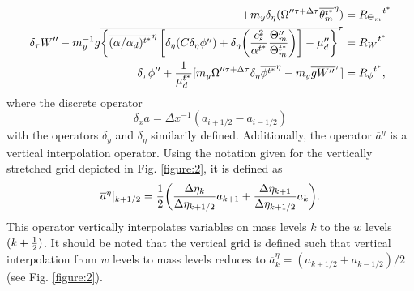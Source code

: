 \begin{align}
+ m_y \delta_\eta (\Omega''^{\tau+\Delta \tau} \overline{\theta_m^{t^*}}^\eta)
                                                &= {R_{\Theta_m}}^{t^*}  
\label{theta-discrete}
\\
 \delta_\tau W'' 
- m_y^{-1} g\overline{\left\{\overline{(\alpha/\alpha_d)^{t^*}}^\eta 
  \left[ \delta_\eta (C \delta_\eta \phi'') 
   +
\delta_\eta\biggl({c_s^2\over\alpha^{t^*}}{\Theta_m''\over\Theta_m^{t^*}}\biggr)
\right]
- \mu_d''\right\}}^\tau
 &= {R_W}^{t^*}  
\label{w-discrete}
\\
 \delta_\tau \phi'' + {1\over\mu_d^{t^*}}
[m_y \Omega''^{\tau+\Delta \tau} \delta_\eta \overline{\phi^{t^*}}^\eta  - m_y\overline{g W''}^\tau ] 
&= {R_\phi}^{t^*},
\label{geo-discrete}
\end{align}
%
\noindent
where the discrete operator 
%
\begin{equation}
\delta_x a = \Delta x^{-1} (a_{i+1/2} -
a_{i-1/2}) 
\end{equation}
%
\noindent
with the operators $\delta_y$ and $\delta_\eta$ similarily defined.
Additionally,
the operator $\overline{a}^\eta$ is a vertical interpolation operator.
Using the notation given for the vertically stretched grid depicted 
in Fig. \ref{figure:2}, it is defined as
%
\begin{equation}
\overline{a}^\eta|_{k+1/2} = {1 \over 2} \biggl(
{\Delta\eta_{k} \over \Delta\eta_{k+1/2}} a_{k+1} +
{\Delta\eta_{k+1} \over \Delta\eta_{k+1/2}} a_{k} \biggr).
\end{equation}
%
\noindent
This operator vertically interpolates variables on mass levels $k$ to the
$w$ levels $(k+{1\over 2})$.  It should be noted that the vertical grid
is defined such that vertical interpolation from $w$ levels to mass
levels reduces to 
$\overline{a}^\eta_k = (a_{k+1/2}+a_{k-1/2})/2$ (see Fig. \ref{figure:2}).

